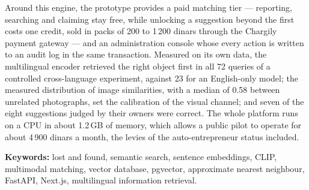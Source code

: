 Around this engine, the prototype provides a paid matching tier --- reporting,
searching and claiming stay free, while unlocking a suggestion beyond the first
costs one credit, sold in packs of 200 to 1\,200 dinars through the Chargily
payment gateway --- and an administration console whose every action is written
to an audit log in the same transaction. Measured on its own data, the
multilingual encoder retrieved the right object first in all 72 queries of a
controlled cross-language experiment, against 23 for an English-only model; the
measured distribution of image similarities, with a median of 0.58 between
unrelated photographs, set the calibration of the visual channel; and seven of
the eight suggestions judged by their owners were correct. The whole platform
runs on a CPU in about 1.2\,GB of memory, which allows a public pilot to operate
for about 4\,900 dinars a month, the levies of the auto-entrepreneur status
included.

\vspace{0.8cm}
\noindent\textbf{Keywords:} lost and found, semantic search, sentence
embeddings, CLIP, multimodal matching, vector database, pgvector, approximate
nearest neighbour, FastAPI, Next.js, multilingual information retrieval.
